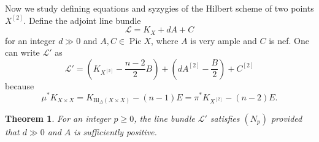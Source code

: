 \documentclass[a4paper]{amsart}
\numberwithin{equation}{section}
\theoremstyle{plain}
\newtheorem{thm}{Theorem}[section]
\theoremstyle{definition}
\theoremstyle{remark}
\numberwithin{figure}{section}
\numberwithin{table}{section}
\numberwithin{equation}{section}
\def \Lcal {\mathcal{L}}
\DeclareMathOperator{\Pic}{Pic}
\begin{document}
Now we study defining equations and syzygies of the Hilbert scheme of two points $X^{[2]}$.
Define the adjoint line bundle
 \[
  \Lcal = K_X + dA + C
 \]
for an integer $d \gg 0$ and $A,C \in \Pic X$, where $A$ is very ample and $C$ is nef.
One can write $\Lcal'$ as
 \[
  \Lcal' = \left( K_{X^{[2]}} - \frac{n-2}{2}B \right) + \left( dA^{[2]} - \frac{B}{2} \right) + C^{[2]}
 \]
because
 \[
  \mu^{\ast} K_{X \times X} = K_{\mathrm{Bl}_{\Delta}(X \times X)} - (n-1)E = \pi^{\ast} K_{X^{[2]}} - (n-2)E.
 \]

\begin{thm} \label{thm:Syzygies-of-Hilbert-scheme-of-two-points}
    For an integer $p \geq 0$, the line bundle $\Lcal'$ satisfies $(N_p)$ provided that $d \gg 0$ and $A$ is sufficiently positive.
\end{thm}
\end{document}
